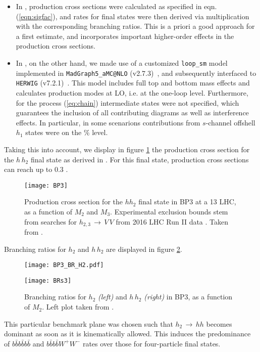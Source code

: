 \begin{itemize}
\item{}In \cite{Robens:2019kga}, production cross sections were calculated as specified in eqn. (\ref{eqn:sigfac}), and rates for final states were then derived via multiplication with the corresponding branching ratios. This is a priori a good approach for a first estimate, and incorporates important higher-order effects in the production cross sections.
\item{}In \cite{Papaefstathiou:2020lyp}, on the other hand, we made use of a customized  \texttt{loop\_sm} model implemented in \texttt{MadGraph5\_aMC@NLO} (v2.7.3)~\cite{Alwall:2014hca, Hirschi:2015iia}, and subsequently interfaced to \texttt{HERWIG} (v7.2.1)~\cite{Bahr:2008pv, Gieseke:2011na, Arnold:2012fq, Bellm:2013hwb, Bellm:2015jjp, Bellm:2017bvx, Bellm:2019zci}. This model includes full top and bottom mass effects and calculates production modes at LO, i.e. at the one-loop level. Furthermore, for the process (\ref{eq:chain}) intermediate states were not specified, which guarantees the inclusion of all contributing diagrams as well as interference effects. In particular, in some scenarions contributions from $s$-channel offshell $h_1$ states were on the $\%$ level.
\end{itemize}
Taking this into account, we display in figure \ref{fig:bp3} the production cross section for the ${h}\,h_2$ final state as derived in \cite{Robens:2019kga}. For this final state, production cross sections can reach up to 0.3 \pb.
\begin{figure}[htb]
\begin{center}%
\texttt{[image: BP3]}
\end{center}
\caption{Production cross section for the ${h}h_2$ final state in BP3 at a 13 \TeV LHC, as a function of $M_2$ and $M_3$. Experimental exclusion bounds stem from searches for $h_{2,3}\,\rightarrow\,V\,V$ from 2016 LHC Run II data \cite{Aaboud:2017rel,Sirunyan:2018qlb,Aaboud:2018bun}. Taken from \cite{Robens:2019kga}.}
\label{fig:bp3}
\end{figure}
Branching ratios for $h_2$ and ${h}\,h_2$ are displayed in figure \ref{fig:BRs}.
\begin{figure}[htb]
\begin{center}%
\begin{minipage}{0.44\textwidth}
\texttt{[image: BP3\_BR\_H2.pdf]}
\end{minipage}
\begin{minipage}{0.52\textwidth}
\texttt{[image: BRs3]}
\end{minipage}
\end{center}
\caption{ Branching ratios for $h_2$ {\sl (left)} and ${h}\,h_2$ {\sl (right)} in BP3, as a function of $M_2$. Left plot taken from \cite{Robens:2019kga}.}
\label{fig:BRs}
\end{figure}
This particular benchmark plane was chosen such that $h_2\,\rightarrow\,{h}{h}$ becomes dominant as soon as it is kinematically allowed. This induces the predominance of $b\bar{b}b\bar{b}b\bar{b}$ and $b\bar{b}b\bar{b}W^+W^-$ rates over those for four-particle final states.

